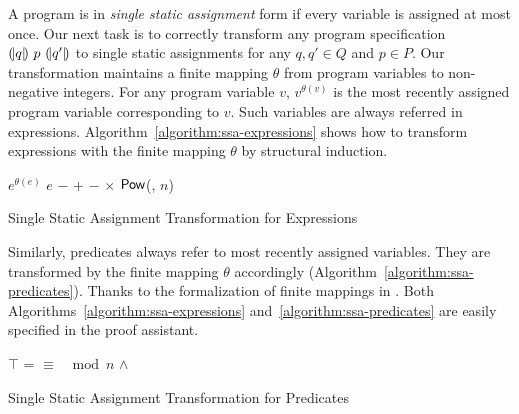 
A program is in \emph{single static assignment} form if every variable
is assigned at most once.  
Our next task is to correctly transform any
program specification ${(\!|}{q}{|\!)}~{p}~{(\!|}{q'}{|\!)}$ to single static
assignments for any $q, q' \in Q$ and $p \in P$. Our transformation
maintains a finite mapping $\theta$ from program variables to
non-negative integers. For any program variable $v$, $v^{\theta(v)}$ is
the most recently assigned program variable corresponding to $v$. 
Such variables are always referred in
expressions. Algorithm~\ref{algorithm:ssa-expressions} shows how
to transform expressions with the finite mapping $\theta$ by
structural induction.

\begin{algorithm}[ht]
  \begin{algorithmic}[1]
       \Return $e^{\theta(e)}$ \EndCase
       \Return $e$ \EndCase
       \Return $-$ \EndCase
        \Return {} $+$ 
      \EndCase
        \Return {} $-$ 
      \EndCase
        \Return {} $\times$ 
      \EndCase
        \Return $\mbox{\textsf{Pow}}$(, $n$)
      \EndCase
    \EndMatch
    \EndFunction
  \end{algorithmic}
  \caption{Single Static Assignment Transformation for Expressions}
  \label{algorithm:ssa-expressions}
\end{algorithm}

Similarly, predicates always refer to most recently assigned
variables. They are transformed by the finite mapping $\theta$
accordingly (Algorithm~\ref{algorithm:ssa-predicates}). Thanks to the
formalization of finite mappings in \coq. Both
Algorithms~\ref{algorithm:ssa-expressions}
and~\ref{algorithm:ssa-predicates} are easily specified in the proof
assistant.

\begin{algorithm}[ht]
  \begin{algorithmic}[1]
      \Case{$\top$} \Return $\top$ \EndCase
        \Return {} = 
      \EndCase
        \Return {} $\equiv$ 
                 $\mod n$
      \EndCase
        \Return {} $\wedge$
      \EndCase
    \EndMatch
    \EndFunction
  \end{algorithmic}
  \caption{Single Static Assignment Transformation for Predicates}
  \label{algorithm:ssa-predicates}
\end{algorithm}

